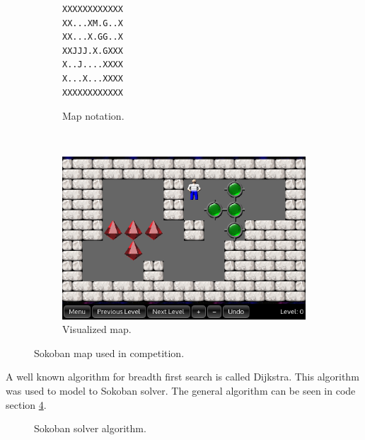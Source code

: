 \begin{figure}[h]
 \centering
 \begin{subfigure}[b]{0.16\textwidth}
   \begin{minipage}{\linewidth}
\begin{verbatim}
XXXXXXXXXXXX
XX...XM.G..X
XX...X.GG..X
XXJJJ.X.GXXX
X..J....XXXX
X...X...XXXX
XXXXXXXXXXXX
\end{verbatim}
 \end{minipage}
 \caption{Map notation.}
 \label{fig:map_notation}
 \end{subfigure}~~~
 \begin{subfigure}[b]{0.3\textwidth}
  \includegraphics[width=\linewidth]{img/sokoban_2015}
 \caption{Visualized map.}
 \label{fig:sokoban_map_2015_img}
 \end{subfigure}
 \caption{Sokoban map used in competition.}
\end{figure}

A well known algorithm for breadth first search is called Dijkstra.
This algorithm was used to model to Sokoban solver.
The general algorithm can be seen in code section \ref{code:sokoban_solver}.

\begin{figure}[h]
\renewcommand\figurename{Code Section}
\centering
{}
 \caption{Sokoban solver algorithm.}
 \label{code:sokoban_solver}
\end{figure}

